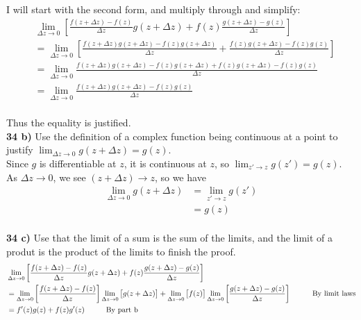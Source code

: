 \documentclass{scrartcl}
\begin{document}
I will start with the second form, and multiply through and simplify:
\begin{align*}
  &\lim_{\Delta z\rightarrow0}\left[\frac{f(z+\Delta z) - f(z)}{\Delta z}g(z+\Delta z) + f(z)\frac{g(z+\Delta z)-g(z)}{\Delta z}\right]\\
  &= \lim_{\Delta z\rightarrow0}\left[\frac{f(z+\Delta z)g(z+\Delta z) - f(z)g(z+\Delta z)}{\Delta z} + \frac{f(z)g(z+\Delta z)-f(z)g(z)}{\Delta z}\right]\\
  &= \lim_{\Delta z\rightarrow0}\frac{f(z+\Delta z)g(z+\Delta z) - f(z)g(z+\Delta z) + f(z)g(z+\Delta z) - f(z)g(z)}{\Delta z}\\
  &= \lim_{\Delta z\rightarrow0}\frac{f(z+\Delta z)g(z+\Delta z) - f(z)g(z)}{\Delta z}\\
\end{align*}

Thus the equality is justified.\\

\textbf{34 b)} Use the definition of a complex function being continuous at a point to justify $\lim_{\Delta z\rightarrow0}g(z+\Delta z)=g(z)$.\\

Since $g$ is differentiable at $z$, it is continuous at $z$, so $\lim_{z'\rightarrow z}g(z') = g(z)$. As $\Delta z\rightarrow 0$, we see $(z + \Delta z)\rightarrow z$, so we have
\begin{align*}
  \lim_{\Delta z\rightarrow 0}g(z+\Delta z) &= \lim_{z'\rightarrow z}g(z')\\
  &= g(z)
\end{align*}\\

\textbf{34 c)} Use that the limit of a sum is the sum of the limits, and the limit of a produt is the product of the limits to finish the proof.\\

\begin{align*}
  &\lim_{\Delta z\rightarrow0}\left[\frac{f(z+\Delta z) - f(z)}{\Delta z}g(z+\Delta z) + f(z)\frac{g(z+\Delta z)-g(z)}{\Delta z}\right]\\
  &= \lim_{\Delta z\rightarrow0}\left[\frac{f(z+\Delta z) - f(z)}{\Delta z}\right]\lim_{\Delta z\rightarrow0}\left[g(z+\Delta z)\right] + \lim_{\Delta z\rightarrow0}\left[f(z)\right]\lim_{\Delta z\rightarrow0}\left[\frac{g(z+\Delta z)-g(z)}{\Delta z}\right] \text{\hspace{.4in}By limit laws}\\
  &= f'(z)g(z) + f(z)g'(z) \text{\hspace{.4in}By part b}
\end{align*}
\end{document}
